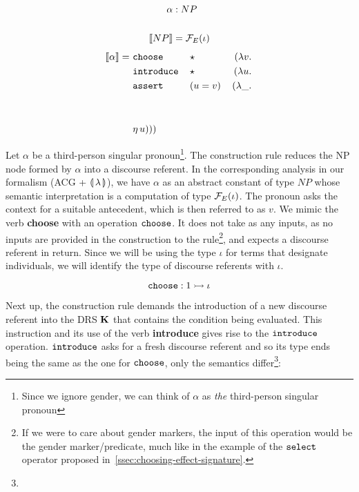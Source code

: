\hspace{-5mm}
\begin{minipage}{0.63\textwidth}
\crprobox
\end{minipage}
\begin{minipage}{0.36\textwidth}
\vspace{0.4cm}
\begin{align*}
\alpha &: NP \\ \\
\llbracket NP \rrbracket &= \mathcal{F}_E(\iota)
\end{align*}
\vspace{0.1cm}
\begin{align*}
\llbracket \alpha \rrbracket =\ & \mathtt{choose}\,&&\star\, &(\lambda v.\,  \\
                & \mathtt{introduce}\,&&\star\, &(\lambda u.\,  \\
                & \mathtt{assert}\,&&(u = v)\, &(\lambda \_.\,  \\
                \\ \\
                & \eta\,u)))
\end{align*}
\end{minipage}

\vspace{6mm}

Let $\alpha$ be a third-person singular pronoun\footnote{Since we ignore
  gender, we can think of $\alpha$ as \emph{the} third-person singular
  pronoun}. The construction rule reduces the NP node formed by $\alpha$
into a discourse referent. In the corresponding analysis in our formalism
(ACG + $\llparenthesis \, \lambda \, \rrparenthesis$), we have $\alpha$ as an abstract constant of
type $NP$ whose semantic interpretation is a computation of type
$\mathcal{F}_E(\iota)$. The pronoun asks the context for a suitable antecedent,
which is then referred to as $v$. We mimic the verb \textbf{choose} with an
operation $\mathtt{choose}$. It does not take as any inputs, as no inputs are
provided in the construction to the rule\footnote{If we were to care about
  gender markers, the input of this operation would be the gender
  marker/predicate, much like in the example of the $\mathtt{select}$ operator
  proposed in~\ref{ssec:choosing-effect-signature}.}, and expects a
discourse referent in return. Since we will be using the type $\iota$ for
terms that designate individuals, we will identify the type of discourse
referents with $\iota$.

$$
\mathtt{choose} : 1 \rightarrowtail \iota
$$

Next up, the construction rule demands the introduction of a new discourse
referent into the DRS $\mathbf{K}$ that contains the condition being
evaluated. This instruction and its use of the verb \textbf{introduce}
gives rise to the $\mathtt{introduce}$ operation. $\mathtt{introduce}$ asks for a
fresh discourse referent and so its type ends being the same as the one for
$\mathtt{choose}$, only the semantics differ\footnote{}:

